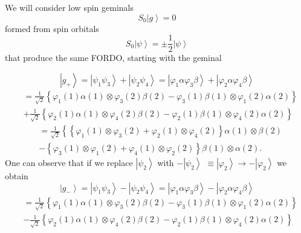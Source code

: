 \documentclass[aps,preprint]{revtex4}%
\begin{document}
We will consider low spin geminals
\[
S_{0}\left\vert g\right\rangle =0
\]
formed from spin orbitals
\[
S_{0}\left\vert \psi\right\rangle =\pm\frac{1}{2}\left\vert \psi\right\rangle
\]
that produce the same FORDO, starting with the geminal%

\[
\left\vert g_{+}\right\rangle =\left\vert \psi_{1}\psi_{3}\right\rangle
+\left\vert \psi_{2}\psi_{4}\right\rangle =\left\vert \varphi_{1}\alpha
\varphi_{3}\beta\right\rangle +\left\vert \varphi_{2}\alpha\varphi_{4}%
\beta\right\rangle
\]%
\begin{align}
&  =\frac{1}{\sqrt{2}}\left\{  \varphi_{1}\left(  1\right)  \alpha\left(
1\right)  \otimes\varphi_{3}\left(  2\right)  \beta\left(  2\right)
-\varphi_{3}\left(  1\right)  \beta\left(  1\right)  \otimes\varphi_{1}\left(
2\right)  \alpha\left(  2\right)  \right\} \nonumber\\
&  +\frac{1}{\sqrt{2}}\left\{  \varphi_{2}\left(  1\right)  \alpha\left(
1\right)  \otimes\varphi_{4}\left(  2\right)  \beta\left(  2\right)
-\varphi_{2}\left(  1\right)  \beta\left(  1\right)  \otimes\varphi_{4}\left(
2\right)  \alpha\left(  2\right)  \right\} \nonumber
\end{align}%
\begin{align}
&  =\frac{1}{\sqrt{2}}\left\{  \left\{  \varphi_{1}\left(  1\right)
\otimes\varphi_{3}\left(  2\right)  +\varphi_{2}\left(  1\right)
\otimes\varphi_{4}\left(  2\right)  \right\}  \alpha\left(  1\right)
\otimes\beta\left(  2\right)  \right. \nonumber\\
&  -\left\{  \varphi_{3}\left(  1\right)  \otimes\varphi_{1}\left(  2\right)
+\varphi_{4}\left(  1\right)  \otimes\varphi_{2}\left(  2\right)  \right\}
\beta\left(  1\right)  \otimes\alpha\left(  2\right)  .
\end{align}
One can observe that if we replace $\left\vert \psi_{2}\right\rangle $ with
$-\left\vert \psi_{2}\right\rangle $ $\equiv\left\vert \varphi_{2}%
\right\rangle \rightarrow-\left\vert \varphi_{2}\right\rangle $ we obtain
\[
\left\vert g_{-}\right\rangle =\left\vert \psi_{1}\psi_{3}\right\rangle
-\left\vert \psi_{2}\psi_{4}\right\rangle =\left\vert \varphi_{1}\alpha
\varphi_{3}\beta\right\rangle -\left\vert \varphi_{2}\alpha\varphi_{4}%
\beta\right\rangle
\]%
\begin{align}
&  =\frac{1}{\sqrt{2}}\left\{  \varphi_{1}\left(  1\right)  \alpha\left(
1\right)  \otimes\varphi_{3}\left(  2\right)  \beta\left(  2\right)
-\varphi_{3}\left(  1\right)  \beta\left(  1\right)  \otimes\varphi_{1}\left(
2\right)  \alpha\left(  2\right)  \right\} \nonumber\\
&  -\frac{1}{\sqrt{2}}\left\{  \varphi_{2}\left(  1\right)  \alpha\left(
1\right)  \otimes\varphi_{4}\left(  2\right)  \beta\left(  2\right)
-\varphi_{2}\left(  1\right)  \beta\left(  1\right)  \otimes\varphi_{4}\left(
2\right)  \alpha\left(  2\right)  \right\} \nonumber
\end{align}%
\end{document}

